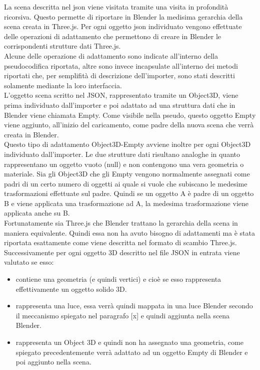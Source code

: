 La scena descritta nel json viene visitata tramite una visita in profondità ricorsiva. 
Questo permette di riportare in Blender la medisima gerarchia della scena creata in Three.js.
Per ogni oggetto json individuato vengono effettuate delle operazioni di adattamento che permettono di creare in Blender le corrispondenti strutture dati Three.js.
\\
Alcune delle operazione di adattamento sono indicate all’interno della pseudocodifica riportata, altre sono invece incapsulate all’interno dei metodi riportati che, per semplifità di descrizione dell’importer, sono stati descritti solamente mediante la loro interfaccia.
\\
L’oggetto scena scritto nel JSON, rappresentato  tramite un Object3D, viene prima individuato dall’importer e poi  adattato ad una struttura dati che in Blender viene chiamata Empty. 
Come visibile nella pseudo, questo oggetto Empty viene aggiunto, all’inizio del caricamento, come padre della nuova scena che verrà creata in Blender.
\\
Questo tipo di adattamento Object3D-Empty avviene inoltre per ogni Object3D individuato dall’importer.
Le due strutture dati risultano analoghe in quanto rappresentano un oggetto vuoto (null) e non contengono una vera geometria o materiale. Sia gli Object3D che gli Empty vengono normalmente assegnati come padri di un certo numero di oggetti ai quale si vuole che subiscano le medesime trasformazioni effettuate sul padre. Quindi se un oggetto A è padre di un oggetto B e viene applicata una trasformazione ad A, la medesima trasformazione viene applicata anche su B.
\\
Fortunatamente sia Three.js che Blender trattano la gerarchia della scena in maniera equivalente. Quindi essa non ha avuto bisogno di adattamenti ma è stata riportata esattamente come viene descritta nel formato di scambio Three.js.
\\
Successivamente per ogni oggetto 3D descritto nel file JSON in entrata viene valutato se esso:
\begin{itemize}
\item contiene una geometria (e quindi vertici) e cioè se esso rappresenta effettivamente un oggetto solido 3D.
\item rappresenta una luce, essa verrà quindi mappata in una luce Blender secondo il meccanismo spiegato nel paragrafo [x] e quindi aggiunta nella scena Blender.
\item rappresenta un Object 3D e quindi non ha assegnato una geometria, come spiegato precedentemente verrà adattato ad un oggetto Empty di Blender e poi aggiunto nella scena.
\end{itemize}
